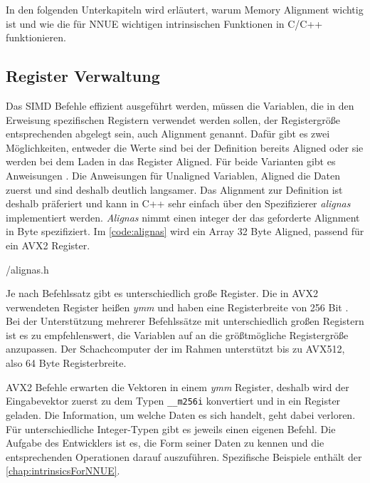 In den folgenden Unterkapiteln wird erläutert, warum Memory Alignment wichtig ist und wie die für \ac{NNUE} wichtigen intrinsischen Funktionen in C/C++ funktionieren.

\subsection{Register Verwaltung}

Das \ac{SIMD} Befehle effizient ausgeführt werden, müssen die Variablen, die in den Erweisung spezifischen Registern verwendet werden sollen, der Registergröße entsprechenden abgelegt sein, auch Alignment genannt. Dafür gibt es zwei Möglichkeiten, entweder die Werte sind bei der Definition bereits Aligned oder sie werden bei dem Laden in das Register Aligned. Für beide Varianten gibt es Anweisungen \cite{intelIntrinsics}. Die Anweisungen für Unaligned Variablen, Aligned die Daten zuerst und sind deshalb deutlich langsamer. Das Alignment zur Definition ist deshalb präferiert und kann in C++ sehr einfach über den Spezifizierer \emph{alignas} implementiert werden. \emph{Alignas} nimmt einen integer der das geforderte Alignment in Byte spezifiziert. Im \autoref{code:alignas} wird ein Array 32 Byte Aligned, passend für ein \ac{AVX2} Register.


{\srcloc/alignas.h}

Je nach Befehlssatz gibt es unterschiedlich große Register. Die in \ac{AVX2} verwendeten Register heißen \emph{ymm} und haben eine Registerbreite von 256 Bit \cite{intelIntrinsics}. Bei der Unterstützung mehrerer Befehlssätze mit unterschiedlich großen Registern ist es zu empfehlenswert, die Variablen auf an die größtmögliche Registergröße anzupassen. Der Schachcomputer der im Rahmen unterstützt bis zu \ac{AVX512}, also 64 Byte Registerbreite.

\ac{AVX2} Befehle erwarten die Vektoren in einem \emph{ymm} Register, deshalb wird der Eingabevektor zuerst zu dem Typen \lstinline[language=C++]{__m256i} konvertiert und in ein Register geladen. Die Information, um welche Daten es sich handelt, geht dabei verloren. Für unterschiedliche Integer-Typen gibt es jeweils einen eigenen Befehl. Die Aufgabe des Entwicklers ist es, die Form seiner Daten zu kennen und die entsprechenden Operationen darauf auszuführen. Spezifische Beispiele enthält der \autoref{chap:intrinsicsForNNUE}.

